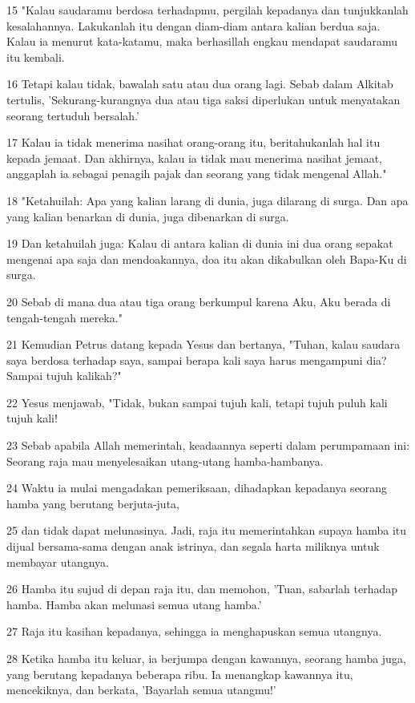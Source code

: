 \par 15 "Kalau saudaramu berdosa terhadapmu, pergilah kepadanya dan tunjukkanlah kesalahannya. Lakukanlah itu dengan diam-diam antara kalian berdua saja. Kalau ia menurut kata-katamu, maka berhasillah engkau mendapat saudaramu itu kembali.
\par 16 Tetapi kalau tidak, bawalah satu atau dua orang lagi. Sebab dalam Alkitab tertulis, 'Sekurang-kurangnya dua atau tiga saksi diperlukan untuk menyatakan seorang tertuduh bersalah.'
\par 17 Kalau ia tidak menerima nasihat orang-orang itu, beritahukanlah hal itu kepada jemaat. Dan akhirnya, kalau ia tidak mau menerima nasihat jemaat, anggaplah ia sebagai penagih pajak dan seorang yang tidak mengenal Allah."
\par 18 "Ketahuilah: Apa yang kalian larang di dunia, juga dilarang di surga. Dan apa yang kalian benarkan di dunia, juga dibenarkan di surga.
\par 19 Dan ketahuilah juga: Kalau di antara kalian di dunia ini dua orang sepakat mengenai apa saja dan mendoakannya, doa itu akan dikabulkan oleh Bapa-Ku di surga.
\par 20 Sebab di mana dua atau tiga orang berkumpul karena Aku, Aku berada di tengah-tengah mereka."
\par 21 Kemudian Petrus datang kepada Yesus dan bertanya, "Tuhan, kalau saudara saya berdosa terhadap saya, sampai berapa kali saya harus mengampuni dia? Sampai tujuh kalikah?"
\par 22 Yesus menjawab, "Tidak, bukan sampai tujuh kali, tetapi tujuh puluh kali tujuh kali!
\par 23 Sebab apabila Allah memerintah, keadaannya seperti dalam perumpamaan ini: Seorang raja mau menyelesaikan utang-utang hamba-hambanya.
\par 24 Waktu ia mulai mengadakan pemeriksaan, dihadapkan kepadanya seorang hamba yang berutang berjuta-juta,
\par 25 dan tidak dapat melunasinya. Jadi, raja itu memerintahkan supaya hamba itu dijual bersama-sama dengan anak istrinya, dan segala harta miliknya untuk membayar utangnya.
\par 26 Hamba itu sujud di depan raja itu, dan memohon, 'Tuan, sabarlah terhadap hamba. Hamba akan melunasi semua utang hamba.'
\par 27 Raja itu kasihan kepadanya, sehingga ia menghapuskan semua utangnya.
\par 28 Ketika hamba itu keluar, ia berjumpa dengan kawannya, seorang hamba juga, yang berutang kepadanya beberapa ribu. Ia menangkap kawannya itu, mencekiknya, dan berkata, 'Bayarlah semua utangmu!'
